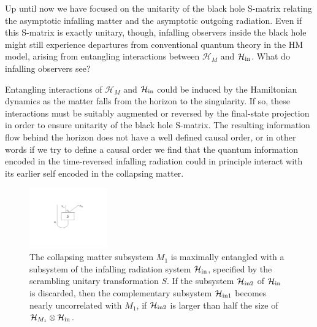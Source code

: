 \documentclass[11pt]{article}
\begin{document}
Up until now we have focused on the unitarity of the black hole S-matrix relating the asymptotic infalling matter and the asymptotic outgoing radiation. Even if this S-matrix is exactly unitary, though, infalling observers inside the black hole might still experience departures from conventional quantum theory in the HM model, arising from entangling interactions between $\mathcal{H}_M$ and  $\mathcal{H}_{\rm in}$. What do infalling observers see?

Entangling interactions of $\mathcal{H}_M$ and  $\mathcal{H}_{\rm in}$ could be induced by the Hamiltonian dynamics as the matter falls from the horizon to the singularity. If so, these interactions must be suitably augmented or reversed by the final-state projection in order to ensure unitarity of the black hole S-matrix. The resulting information flow behind the horizon does not have a well defined causal order, or in other words if we try to define a causal order we find that the quantum information encoded in the time-reversed infalling radiation could in principle interact with its earlier self encoded in the collapsing matter. 

\begin{figure}[t]
\begin{center}
\includegraphics[width=0.3\textwidth]{discard.pdf}
\end{center}
\caption{The collapsing matter subsystem $M_1$ is maximally entangled with a subsystem of the infalling radiation system $\mathcal{H}_{\rm in}$, specified by the scrambling unitary transformation $S$. If the subsystem $\mathcal{H}_{{\rm in}2}$ of $\mathcal{H}_{\rm in}$ is discarded, then the complementary subsystem $\mathcal{H}_{{\rm in}1}$ becomes nearly uncorrelated with $M_1$, if $\mathcal{H}_{{\rm in}2}$ is larger than half the size of $\mathcal{H}_{M_1}\otimes \mathcal{H}_{\rm in}$.}
\label{fig:discard}
\end{figure}
\end{document}
